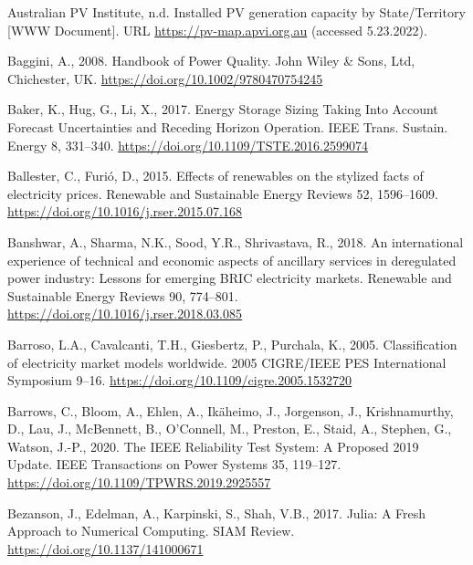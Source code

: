\documentclass[12pt,a4paper,]{report}
\newlength{\cslhangindent}
\newenvironment{CSLReferences}[2] %
 {%
  \setlength{\parindent}{0pt}
  \ifodd #1 \everypar{\setlength{\hangindent}{\cslhangindent}}\ignorespaces\fi
  \ifnum #2 > 0
  \setlength{\parskip}{#2\baselineskip}
  \fi
 }%
 {}
\begin{document}
\begin{CSLReferences}{1}{0}
\leavevmode{}%
Australian PV Institute, n.d. Installed {PV} generation capacity by
{State}/{Territory} {[}WWW Document{]}. URL
\url{https://pv-map.apvi.org.au} (accessed 5.23.2022).

\leavevmode{}%
Baggini, A., 2008. Handbook of {Power Quality}. John Wiley \& Sons, Ltd,
Chichester, UK. \url{https://doi.org/10.1002/9780470754245}

\leavevmode{}%
Baker, K., Hug, G., Li, X., 2017. Energy {Storage Sizing Taking Into
Account Forecast Uncertainties} and {Receding Horizon Operation}. IEEE
Trans. Sustain. Energy 8, 331--340.
\url{https://doi.org/10.1109/TSTE.2016.2599074}

\leavevmode{}%
Ballester, C., Furió, D., 2015. Effects of renewables on the stylized
facts of electricity prices. Renewable and Sustainable Energy Reviews
52, 1596--1609. \url{https://doi.org/10.1016/j.rser.2015.07.168}

\leavevmode{}%
Banshwar, A., Sharma, N.K., Sood, Y.R., Shrivastava, R., 2018. An
international experience of technical and economic aspects of ancillary
services in deregulated power industry: {Lessons} for emerging {BRIC}
electricity markets. Renewable and Sustainable Energy Reviews 90,
774--801. \url{https://doi.org/10.1016/j.rser.2018.03.085}

\leavevmode{}%
Barroso, L.A., Cavalcanti, T.H., Giesbertz, P., Purchala, K., 2005.
Classification of electricity market models worldwide. 2005 CIGRE/IEEE
PES International Symposium 9--16.
\url{https://doi.org/10.1109/cigre.2005.1532720}

\leavevmode{}%
Barrows, C., Bloom, A., Ehlen, A., Ikäheimo, J., Jorgenson, J.,
Krishnamurthy, D., Lau, J., McBennett, B., O'Connell, M., Preston, E.,
Staid, A., Stephen, G., Watson, J.-P., 2020. The {IEEE Reliability Test
System}: {A Proposed} 2019 {Update}. IEEE Transactions on Power Systems
35, 119--127. \url{https://doi.org/10.1109/TPWRS.2019.2925557}

\leavevmode{}%
Bezanson, J., Edelman, A., Karpinski, S., Shah, V.B., 2017. Julia: {A
Fresh Approach} to {Numerical Computing}. SIAM Review.
\url{https://doi.org/10.1137/141000671}


\end{CSLReferences}
\end{document}
